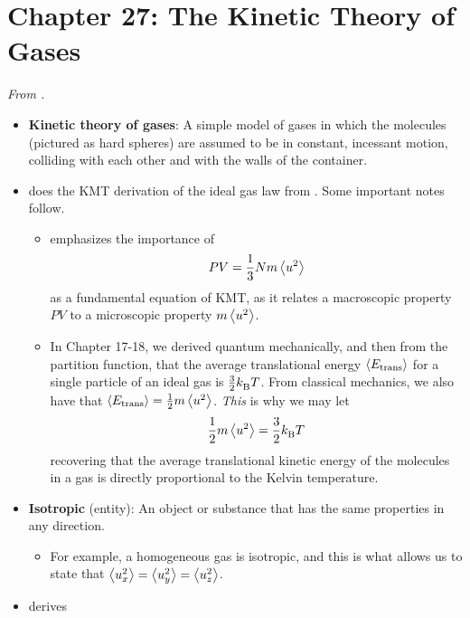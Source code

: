\documentclass[../notes.tex]{subfiles}
\begin{document}
\section{Chapter 27: The Kinetic Theory of Gases}
\emph{From \textcite{bib:McQuarrieSimon}.}
\begin{itemize}
    \item {}\textbf{Kinetic theory of gases}: A simple model of gases in which the molecules (pictured as hard spheres) are assumed to be in constant, incessant motion, colliding with each other and with the walls of the container.
    \item \textcite{bib:McQuarrieSimon} does the KMT derivation of the ideal gas law from \textcite{bib:APChemNotes}. Some important notes follow.
    \begin{itemize}
        \item \textcite{bib:McQuarrieSimon} emphasizes the importance of
        \begin{equation*}
            PV = \frac{1}{3}Nm\left\langle{u^2}\right\rangle
        \end{equation*}
        as a fundamental equation of KMT, as it relates a macroscopic property $PV$ to a microscopic property $m\left\langle{u^2}\right\rangle$.
        \item In Chapter 17-18, we derived quantum mechanically, and then from the partition function, that the average translational energy $\left\langle{E_\text{trans}}\right\rangle$ for a single particle of an ideal gas is $\frac{3}{2}{k_\text{B}^{}} T$. From classical mechanics, we also have that $\left\langle{E_\text{trans}}\right\rangle=\frac{1}{2}m\left\langle{u^2}\right\rangle$. \emph{This} is why we may let
        \begin{equation*}
            \frac{1}{2}m\left\langle{u^2}\right\rangle = \frac{3}{2}{k_\text{B}^{}} T
        \end{equation*}
        recovering that the average translational kinetic energy of the molecules in a gas is directly proportional to the Kelvin temperature.
    \end{itemize}
    \item \textbf{Isotropic} (entity): An object or substance that has the same properties in any direction.
    \begin{itemize}
        \item For example, a homogeneous gas is isotropic, and this is what allows us to state that $\left\langle{u_x^2}\right\rangle=\left\langle{u_y^2}\right\rangle=\left\langle{u_z^2}\right\rangle$.
    \end{itemize}
    \item \textcite{bib:McQuarrieSimon} derives
    \begin{equation*}

\end{equation*}
\end{itemize}
\end{document}
